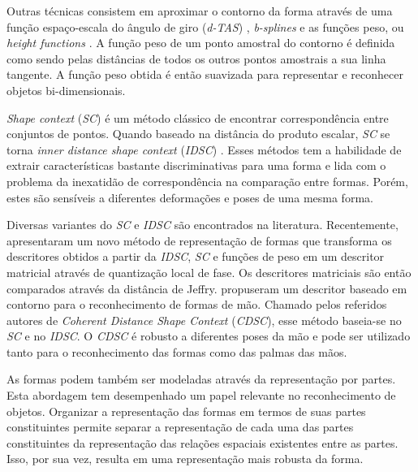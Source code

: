Outras técnicas consistem em aproximar o contorno da forma através de uma função espaço-escala do ângulo de giro (\textit{d-TAS}) \cite{4202050}, \textit{b-splines} \cite{1168520} e as funções peso, ou \textit{height functions} \cite{Wang2012134}. A função peso de um ponto amostral do contorno é definida como sendo pelas distâncias de todos os outros pontos amostrais a sua linha tangente. A função peso obtida é então suavizada para representar e reconhecer objetos bi-dimensionais.

\textit{Shape context} (\textit{SC}) \cite{Belongie:2002} é um método clássico de encontrar correspondência entre conjuntos de pontos. Quando baseado na distância do produto escalar, \textit{SC} se torna \textit{inner distance shape context} (\textit{IDSC}) \cite{1467513}. Esses métodos tem a habilidade de extrair características bastante discriminativas para uma forma e lida com o problema da inexatidão de correspondência na comparação entre formas. Porém, estes são sensíveis a diferentes deformações e poses de uma mesma forma.

Diversas variantes do \textit{SC} e \textit{IDSC} são encontrados na literatura. Recentemente,  apresentaram um novo método de representação de formas que transforma os descritores obtidos a partir da \textit{IDSC}, \textit{SC} e funções de peso em um descritor matricial através de quantização local de fase. Os descritores matriciais são então comparados através da distância de Jeffry.  propuseram um descritor baseado em contorno para o reconhecimento de formas de mão. Chamado pelos referidos autores de \textit{Coherent Distance Shape Context} (\textit{CDSC}), esse método baseia-se no \textit{SC} e no \textit{IDSC}. O \textit{CDSC} é robusto a diferentes poses da mão e pode ser utilizado tanto para o reconhecimento das formas como das palmas das mãos.  

As formas podem também ser modeladas através da representação por partes. Esta abordagem tem desempenhado um papel relevante no reconhecimento de objetos. Organizar a representação das formas em termos de suas partes constituintes permite separar a representação de cada uma das partes constituintes da representação das relações espaciais existentes entre as partes. Isso, por sua vez, resulta em uma representação mais robusta da forma. 

